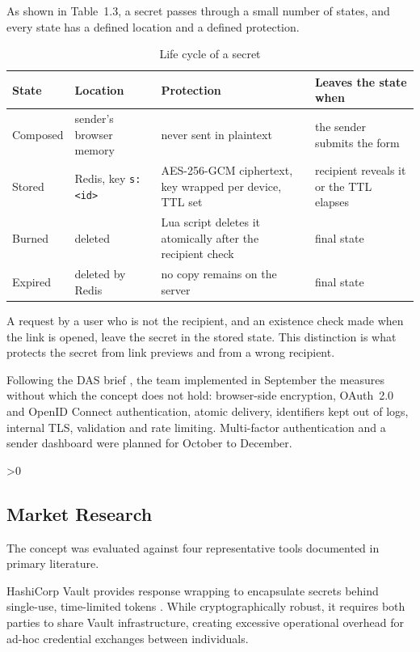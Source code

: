 \documentclass[12pt,a4paper]{article}
\numberwithin{equation}{section}
\numberwithin{figure}{section}
\numberwithin{table}{section}
\newcommand{\subsec}[1]{%
  \ifnum\value{subsection}>0\clearpage\fi
  \subsection{#1}%
}
\newcommand{\tablesetup}{\fontsize{11pt}{13pt}\selectfont\singlespacing\renewcommand{\arraystretch}{1.15}}
\newcommand{\leadin}[1]{%
  {\onehalfspacing\setlength{\parindent}{1.25cm}\indent #1\par}\vspace{8pt}}
\begin{document}
\begin{table}[H]
\leadin{As shown in Table~1.3, a secret passes through a small number of states, and every state has a defined location and a defined protection.}
\tablesetup
\caption{Life cycle of a secret}
\label{tab:lifecycle}
\begin{tabularx}{\textwidth}{|P{0.14\textwidth}|P{0.21\textwidth}|L|P{0.24\textwidth}|}
\hline
\textbf{State} & \textbf{Location} & \textbf{Protection} & \textbf{Leaves the state when} \\ \hline
Composed & sender's browser memory & never sent in plaintext & the sender submits the form \\ \hline
Stored & Redis, key \texttt{s:<id>} & AES-256-GCM ciphertext, key wrapped per device, TTL set & recipient reveals it or the TTL elapses \\ \hline
Burned & deleted & Lua script deletes it atomically after the recipient check & final state \\ \hline
Expired & deleted by Redis & no copy remains on the server & final state \\ \hline
\end{tabularx}
\end{table}

A request by a user who is not the recipient, and an existence check made when the link is opened, leave the secret in the stored state. This distinction is what protects the secret from link previews and from a wrong recipient.

Following the DAS brief \cite{dasbrief}, the team implemented in September the measures without which the concept does not hold: browser-side encryption, OAuth~2.0 and OpenID Connect authentication, atomic delivery, identifiers kept out of logs, internal TLS, validation and rate limiting. Multi-factor authentication and a sender dashboard were planned for October to December.

\subsec{Market Research}

The concept was evaluated against four representative tools documented in primary literature.

HashiCorp Vault provides response wrapping to encapsulate secrets behind single-use, time-limited tokens \cite{vaultwrap}. While cryptographically robust, it requires both parties to share Vault infrastructure, creating excessive operational overhead for ad-hoc credential exchanges between individuals.
\end{document}
